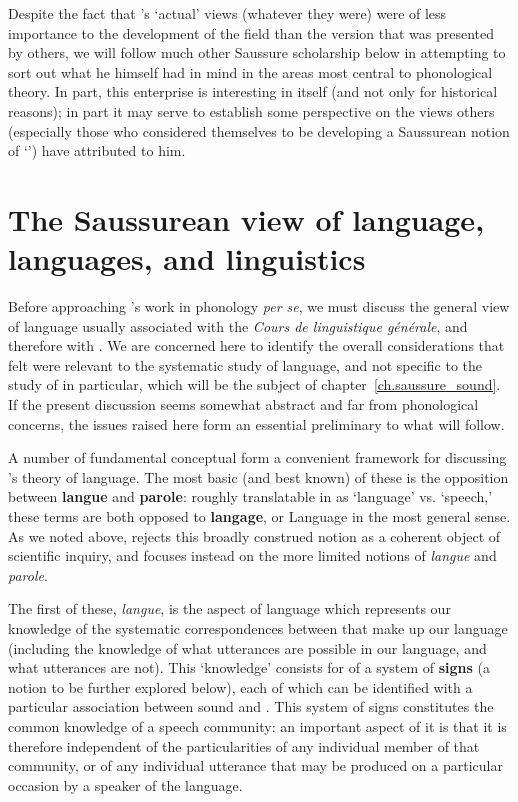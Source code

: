Despite the fact that {\Saussure}'s `actual' views (whatever they were)
were of less importance to the development of the field than the
version that was presented by others, we will follow much other
Saussure scholarship below in attempting to sort out what he himself
had in mind in the areas most central to phonological theory.  In
part, this enterprise is interesting in itself (and not only for
historical reasons); in part it may serve to establish some
perspective on the views others (especially those who considered
themselves to be developing a Saussurean notion of `')
have attributed to him.

\section{The Saussurean view of language, languages, and linguistics} 

Before approaching {\Saussure}'s work in phonology \emph{per se}, we must
discuss the general view of language usually associated with the
\textsl{Cours de linguistique géné\-rale}, and therefore with
{\Saussure}.  We are concerned here to identify the overall
considerations that {\Saussure} felt were relevant to the systematic
study of language, and not specific to the study of  in
particular, which will be the subject of
chapter~\ref{ch.saussure_sound}.  If the present discussion seems
somewhat abstract and far from phonological concerns, the issues
raised here form an essential preliminary to what will follow.

A number of fundamental conceptual  form a convenient
framework for discussing {\Saussure}'s theory of language.  The most
basic (and best known) of these is the opposition between
\textbf{langue} and \textbf{parole}: roughly translatable in
 as `language' vs. `speech,' these terms are both opposed to
\textbf{langage}, or Language in the most general sense.  As we
noted above, {\Saussure} rejects this broadly construed notion as a
coherent object of scientific inquiry, and focuses instead on the more
limited notions of \emph{langue} and \emph{parole}.

The first of these, \emph{langue}, is the aspect of language which
represents our knowledge of the systematic correspondences between
 that make up our language (including the knowledge
of what utterances are possible in our language, and what utterances
are not).  This `knowledge' consists for {\Saussure} of a system of
\textbf{signs} (a notion to be further explored below), each of which
can be identified with a particular association between sound and
.  This system of signs constitutes the common knowledge of a
speech community: an important aspect of it is that it is therefore
independent of the particularities of any individual member of that
community, or of any individual utterance that may be produced on a
particular occasion by a speaker of the language.

